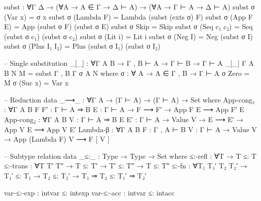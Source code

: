 \documentclass{article}
\begin{document}
\begin{prev}
\begin{code}
subst : ∀{Γ Δ}  →  (∀{A}  →  A ∈ Γ  →  Δ ⊢ A)  →  (∀{A}  →  Γ ⊢ A  →  Δ ⊢ A)
subst σ (Var x) = σ x
subst σ (Lambda F) = Lambda (subst (exts σ) F)
subst σ (App F E) = App (subst σ F) (subst σ E)
subst σ Skip = Skip
subst σ (Seq c₁ c₂) = Seq (subst σ c₁) (subst σ c₂)
subst σ (Lit i) = Lit i
subst σ (Neg I) = Neg (subst σ I)
subst σ (Plus I₁ I₂) = Plus (subst σ I₁) (subst σ I₂)

-- Single substitution
_[_] : ∀{Γ A B}  →  Γ , B ⊢ A  →  Γ ⊢ B  →  Γ ⊢ A
_[_] {Γ} {A} {B} N M = subst {Γ , B} {Γ} σ {A} N
    where
    σ : ∀ {A}  →  A ∈ Γ , B  →  Γ ⊢ A
    σ Zero = M
    σ (Suc x) = Var x

-- Reduction
data _⟶_ : ∀{Γ A}  →  (Γ ⊢ A)  →  (Γ ⊢ A)  →  Set where
    App-cong₁ : ∀{Γ A B} {F F′ : Γ ⊢ A ⇒ B} {E : Γ ⊢ A}  →  F ⟶ F′  →  App F E ⟶ App F′ E
    App-cong₂ : ∀{Γ A B} {V : Γ ⊢ A ⇒ B} {E E′ : Γ ⊢ A}  →  Value V  →  E ⟶ E′  →  App V E ⟶ App V E′
    Lambda-β : ∀{Γ A B} {F : Γ , A ⊢ B} {V : Γ ⊢ A}  →  Value V  →  App (Lambda F) V ⟶ F [ V ]

-- Subtype relation
data _≤:_ : Type  →  Type  →  Set where
    ≤:-refl : ∀{T}  →  T ≤: T
    ≤:-trans : ∀{T T′ T″}  →  T ≤: T′  →  T′ ≤: T″  →  T ≤: T″
    ≤:-fn : ∀{T₁ T₁′ T₂ T₂′}  →  T₁′ ≤: T₁  →  T₂ ≤: T₂′  →  T₁ ⇒ T₂ ≤: T₁′ ⇒ T₂′

    var-≤:-exp : intvar ≤: intexp
    var-≤:-acc : intvar ≤: intacc
\end{code}
\end{prev}
\end{document}
